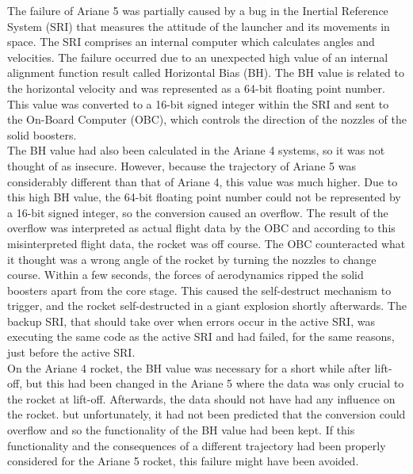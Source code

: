 The failure of Ariane 5 was partially caused by a bug in the Inertial Reference System (SRI) that measures the attitude of the launcher and its movements in space. The SRI comprises an internal computer which calculates angles and velocities.
The failure occurred due to an unexpected high value of an internal alignment function result called Horizontal Bias (BH). The BH value is related to the horizontal velocity and was represented as a 64-bit floating point number. This value was converted to a 16-bit signed integer within the SRI and sent to the On-Board Computer (OBC), which controls the direction of the nozzles of the solid boosters.\\

The BH value had also been calculated in the Ariane 4 systems, so it was not thought of as insecure. However, because the trajectory of Ariane 5 was considerably different than that of Ariane 4, this value was much higher. Due to this high BH value, the 64-bit floating point number could not be represented by a 16-bit signed integer, so the conversion caused an overflow.
The result of the overflow was interpreted as actual flight data by the OBC and according to this misinterpreted flight data, the rocket was off course. The OBC counteracted what it thought was a wrong angle of the rocket by turning the nozzles to change course. Within a few seconds, the forces of aerodynamics ripped the solid boosters apart from the core stage. This caused the self-destruct mechanism to trigger, and the rocket self-destructed in a giant explosion shortly afterwards. The backup SRI, that should take over when errors occur in the active SRI, was executing the same code as the active SRI and had failed, for the same reasons, just before the active SRI.\\

On the Ariane 4 rocket, the BH value was necessary for a short while after lift-off, but this had been changed in the Ariane 5 where the data was only crucial to the rocket at lift-off. Afterwards, the data should not have had any influence on the rocket. but unfortunately, it had not been predicted that the conversion could overflow and so the functionality of the BH value had been kept. If this functionality and the consequences of a different trajectory had been properly considered for the Ariane 5 rocket, this failure might have been avoided.
